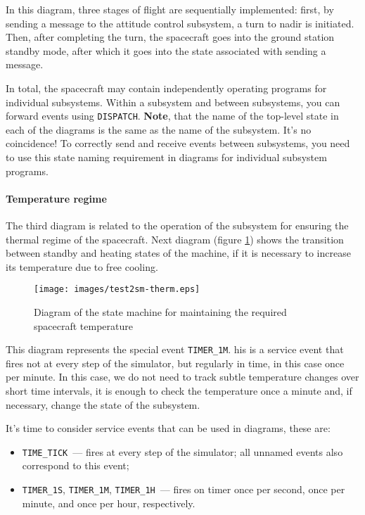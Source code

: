 \documentclass[12pt,a4paper]{article}
\begin{document}
In this diagram, three stages of flight are sequentially implemented: first, by sending a message to the attitude control subsystem, a turn to nadir is initiated. Then, after completing the turn, the spacecraft goes into the ground station standby mode, after which it goes into the state associated with sending a message.

In total, the spacecraft may contain independently operating programs for individual subsystems. Within a subsystem and between subsystems, you can forward events using
\verb'DISPATCH'. \textbf{Note}, that the name of the top-level state in each of the diagrams is the same as the name of the subsystem. It's no coincidence! To correctly send and receive events between subsystems, you need to use this state naming requirement in diagrams for individual subsystem programs.

\paragraph{Temperature regime} The third diagram is related to the operation of the subsystem for ensuring the thermal regime of the spacecraft. Next diagram (figure \ref{Pic:Test2SM-Therm}) shows the transition between standby and heating states of the machine, if it is necessary to increase its temperature due to free cooling.

\begin{figure}[tbh]
  \begin{center}
    \texttt{[image: images/test2sm-therm.eps]}
    \caption{Diagram of the state machine for maintaining the required spacecraft temperature}
    \label{Pic:Test2SM-Therm}
  \end{center}
\end{figure}

This diagram represents the special event \verb'TIMER_1M'. his is a service event that fires not at every step of the simulator, but regularly in time, in this case once per minute. In this case, we do not need to track subtle temperature changes over short time intervals, it is enough to check the temperature once a minute and, if necessary, change the state of the subsystem.

It's time to consider service events that can be used in diagrams, these are:

\begin{itemize}
\item \verb'TIME_TICK'~--- fires at every step of the simulator; all unnamed events also correspond to this event;
\item \verb'TIMER_1S', \verb'TIMER_1M', \verb'TIMER_1H'~--- fires on timer once per second, once per minute, and once per hour, respectively.
\end{itemize}
\end{document}
